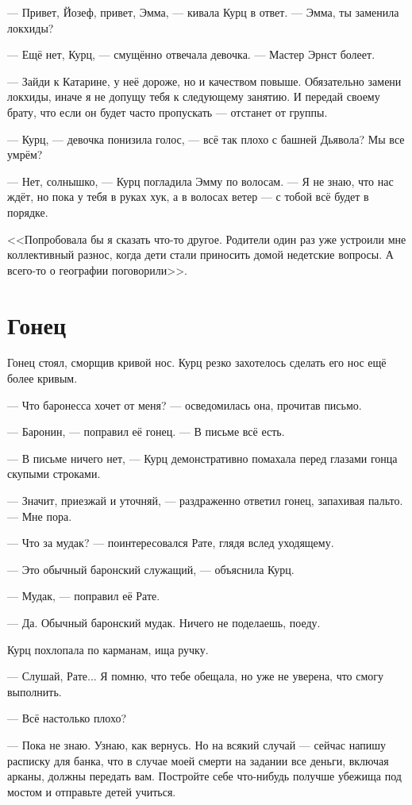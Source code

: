 --- Привет, Йозеф, привет, Эмма, --- кивала Курц в ответ.
--- Эмма, ты заменила локхиды?

--- Ещё нет, Курц, --- смущённо отвечала девочка.
--- Мастер Эрнст болеет.

--- Зайди к Катарине, у неё дороже, но и качеством повыше.
Обязательно замени локхиды, иначе я не допущу тебя к следующему занятию.
И передай своему брату, что если он будет часто пропускать --- отстанет от группы.

--- Курц, --- девочка понизила голос, --- всё так плохо с башней Дьявола?
Мы все умрём?

--- Нет, солнышко, --- Курц погладила Эмму по волосам.
--- Я не знаю, что нас ждёт, но пока у тебя в руках хук, а в волосах ветер --- с тобой всё будет в порядке.

<<Попробовала бы я сказать что-то другое.
Родители один раз уже устроили мне коллективный разнос, когда дети стали приносить домой недетские вопросы.
А всего-то о географии поговорили>>.

\section{Гонец}

Гонец стоял, сморщив кривой нос.
Курц резко захотелось сделать его нос ещё более кривым.

--- Что баронесса хочет от меня? --- осведомилась она, прочитав письмо.

--- Баронин, --- поправил её гонец.
--- В письме всё есть.

--- В письме ничего нет, --- Курц демонстративно помахала перед глазами гонца скупыми строками.

--- Значит, приезжай и уточняй, --- раздраженно ответил гонец, запахивая пальто.
--- Мне пора.

--- Что за мудак? --- поинтересовался Рате, глядя вслед уходящему.

--- Это обычный баронский служащий, --- объяснила Курц.

--- Мудак, --- поправил её Рате.

--- Да.
Обычный баронский мудак.
Ничего не поделаешь, поеду.

Курц похлопала по карманам, ища ручку.

--- Слушай, Рате...
Я помню, что тебе обещала, но уже не уверена, что смогу выполнить.

--- Всё настолько плохо?

--- Пока не знаю.
Узнаю, как вернусь.
Но на всякий случай --- сейчас напишу расписку для банка, что в случае моей смерти на задании все деньги, включая арканы, должны передать вам.
Постройте себе что-нибудь получше убежища под мостом и отправьте детей учиться.

